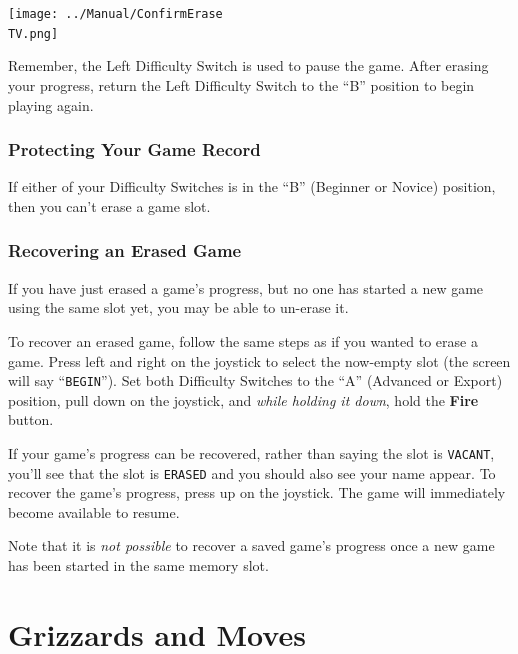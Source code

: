 \documentclass[10pt,twocolumn,openany,article]{memoir}
\newcommand\TV{NTSC}
\newcommand\TV{PAL}
\newcommand\TV{SECAM}
\begin{document}
\begin{description}
\begin{center}
  \texttt{[image: ../Manual/ConfirmErase\\TV.png]}
\end{center}

\fi

\ifdefined\TVSECAM

Remember,  the  Left  Difficulty  Switch  is used  to  pause  the  game.
After erasing  your progress, return  the Left Difficulty Switch  to the
``B'' position to begin playing again.

\fi

\subsection{Protecting Your Game Record}

If  either of  your Difficulty  Switches is  in the  ``B'' (Beginner  or
Novice) position, then you can't erase a game slot.

\ifdefined\DEMO\else

\subsection{Recovering an Erased Game}

If you have just erased a game's  progress, but no one has started a new
game using the same slot yet, you may be able to un-erase it.

To recover  an erased game,  follow the same steps  as if you  wanted to
erase  a game.  Press  left and  right  on the  joystick  to select  the
now-empty  slot  (the  screen  will say  ``\texttt{BEGIN}'').  Set  both
Difficulty Switches  to the  ``A'' (Advanced  or Export)  position, pull
down  on  the joystick,  and  \emph{while  holding  it down},  hold  the
\textbf{Fire} button.

If your game's progress can be recovered, rather than saying the slot is
\texttt{VACANT}, you'll  see that  the slot  is \texttt{ERASED}  and you
should also see your name appear.  To recover the game's progress, press
up  on  the  joystick.  The   game  will  immediately  become  available
to resume.

Note that it  is \emph{not possible} to recover a  saved game's progress
once a new game has been started in the same memory slot.

\fi

\fi %

\clearpage
\chapter{Grizzards and Moves}
\label{ch:Grizzards}


\end{description}
\end{document}
